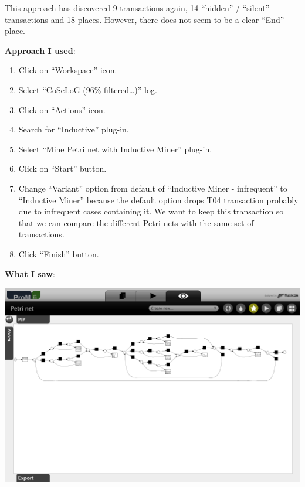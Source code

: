 \documentclass[]{article}
\begin{document}
This approach has discovered 9 transactions again, 14 ``hidden'' /
``silent'' transactions and 18 places. However, there does not seem to
be a clear ``End'' place.

\textbf{Approach I used}:

\begin{enumerate}
\def\labelenumi{\arabic{enumi}.}
\setcounter{enumi}{44}
\itemsep1pt\parskip0pt
\item
  Click on ``Workspace'' icon.\\
\item
  Select ``CoSeLoG (96\% filtered\ldots{})'' log.\\
\item
  Click on ``Actions'' icon.\\
\item
  Search for ``Inductive'' plug-in.\\
\item
  Select ``Mine Petri net with Inductive Miner'' plug-in.\\
\item
  Click on ``Start'' button.
\item
  Change ``Variant'' option from default of ``Inductive Miner -
  infrequent'' to ``Inductive Miner'' because the default option drops
  T04 transaction probably due to infrequent cases containing it. We
  want to keep this transaction so that we can compare the different
  Petri nets with the same set of transactions.\\
\item
  Click ``Finish'' button.
\end{enumerate}

\textbf{What I saw}:

\includegraphics{CoSeLoG_Step_05_Filter96_PetriNet_Inductive.png}
\end{document}

